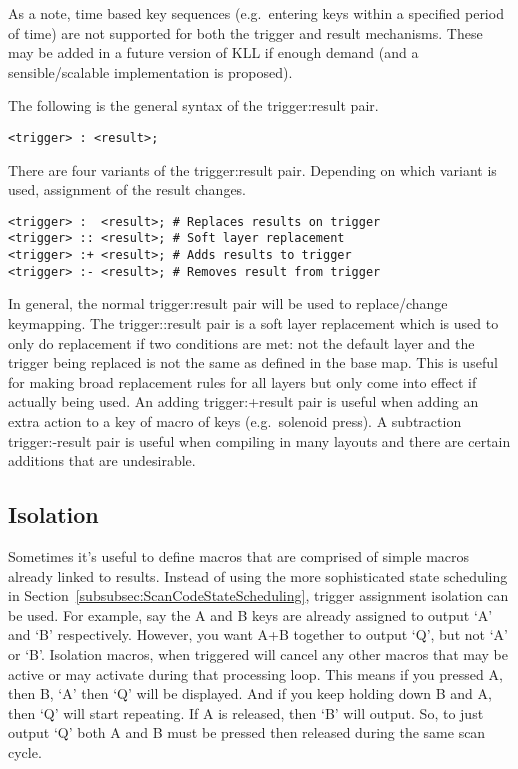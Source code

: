\documentclass{kiibohd-template}
\begin{document}
As a note, time based key sequences (e.g.\ entering keys within a specified period of time) are not supported for both the trigger and result mechanisms.
These may be added in a future version of KLL if enough demand (and a sensible/scalable implementation is proposed).

The following is the general syntax of the trigger:result pair.

\begin{lstlisting}
<trigger> : <result>;
\end{lstlisting}

There are four variants of the trigger:result pair.
Depending on which variant is used, assignment of the result changes.

\begin{lstlisting}
<trigger> :  <result>; # Replaces results on trigger
<trigger> :: <result>; # Soft layer replacement
<trigger> :+ <result>; # Adds results to trigger
<trigger> :- <result>; # Removes result from trigger
\end{lstlisting}

In general, the normal trigger:result pair will be used to replace/change keymapping.
The trigger::result pair is a soft layer replacement which is used to only do replacement if two conditions are met: not the default layer and the trigger being replaced is not the same as defined in the base map.
This is useful for making broad replacement rules for all layers but only come into effect if actually being used.
An adding trigger:+result pair is useful when adding an extra action to a key of macro of keys (e.g.\ solenoid press).
A subtraction trigger:-result pair is useful when compiling in many layouts and there are certain additions that are undesirable.


\subsection{Isolation}

Sometimes it's useful to define macros that are comprised of simple macros already linked to results.
Instead of using the more sophisticated state scheduling in Section~\ref{subsubsec:ScanCodeStateScheduling}, trigger assignment isolation can be used.
For example, say the A and B keys are already assigned to output `A' and `B' respectively.
However, you want A+B together to output `Q', but not `A' or `B'.
Isolation macros, when triggered will cancel any other macros that may be active or may activate during that processing loop.
This means if you pressed A, then B, `A' then `Q' will be displayed.
And if you keep holding down B and A, then `Q' will start repeating.
If A is released, then `B' will output.
So, to just output `Q' both A and B must be pressed then released during the same scan cycle.
\end{document}
